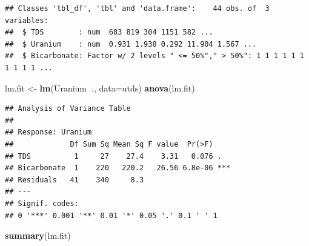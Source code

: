 \documentclass[]{book}
\newenvironment{Shaded}{\begin{snugshade}}{\end{snugshade}}
\newcommand{\CommentTok}[1]{\textcolor[rgb]{0.56,0.35,0.01}{\textit{#1}}}
\newcommand{\DataTypeTok}[1]{\textcolor[rgb]{0.13,0.29,0.53}{#1}}
\newcommand{\DecValTok}[1]{\textcolor[rgb]{0.00,0.00,0.81}{#1}}
\newcommand{\KeywordTok}[1]{\textcolor[rgb]{0.13,0.29,0.53}{\textbf{#1}}}
\newcommand{\NormalTok}[1]{#1}
\newcommand{\OperatorTok}[1]{\textcolor[rgb]{0.81,0.36,0.00}{\textbf{#1}}}
\newcommand{\StringTok}[1]{\textcolor[rgb]{0.31,0.60,0.02}{#1}}
\theoremstyle{definition}
\theoremstyle{definition}
\theoremstyle{definition}
\theoremstyle{remark}
\begin{document}
\begin{Shaded}
\end{Shaded}

\begin{verbatim}
## Classes 'tbl_df', 'tbl' and 'data.frame':    44 obs. of  3 variables:
##  $ TDS        : num  683 819 304 1151 582 ...
##  $ Uranium    : num  0.931 1.938 0.292 11.904 1.567 ...
##  $ Bicarbonate: Factor w/ 2 levels " <= 50%"," > 50%": 1 1 1 1 1 1 1 1 1 1 ...
\end{verbatim}

\begin{Shaded}
\begin{Highlighting}[]
\NormalTok{lm.fit <-}\StringTok{ }\KeywordTok{lm}\NormalTok{(Uranium}\OperatorTok{~}\NormalTok{., }\DataTypeTok{data=}\NormalTok{utds)}
\KeywordTok{anova}\NormalTok{(lm.fit)}
\end{Highlighting}
\end{Shaded}

\begin{verbatim}
## Analysis of Variance Table
## 
## Response: Uranium
##             Df Sum Sq Mean Sq F value  Pr(>F)    
## TDS          1     27    27.4    3.31   0.076 .  
## Bicarbonate  1    220   220.2   26.56 6.8e-06 ***
## Residuals   41    340     8.3                    
## ---
## Signif. codes:  
## 0 '***' 0.001 '**' 0.01 '*' 0.05 '.' 0.1 ' ' 1
\end{verbatim}

\begin{Shaded}
\begin{Highlighting}[]
\KeywordTok{summary}\NormalTok{(lm.fit)}
\end{Highlighting}
\end{Shaded}
\end{document}
